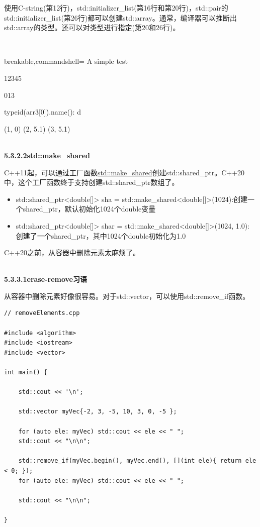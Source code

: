 使用C-string(第12行)，std::initializer\_list(第16行和第20行)，std::pair的std::initializer\_list(第26行)都可以创建std::array。通常，编译器可以推断出std::array的类型。还可以对类型进行指定(第20和26行)。

\hspace*{\fill} \\ %
\begin{tcblisting}{breakable,commandshell={}}
A simple test

12345

013

typeid(arr3[0]).name(): d

(1, 0)
(2, 5.1)
(3, 5.1)
\end{tcblisting}

\hspace*{\fill} \\ %
\noindent
\textbf{5.3.2.2\hspace{0.2cm}std::make\_shared}

C++11起，可以通过工厂函数\href{https://en.cppreference.com/w/cpp/memory/shared_ptr/make_shared}{std::make\_shared}创建std::shared\_ptr。C++20中，这个工厂函数终于支持创建std::shared\_ptr数组了。

\begin{itemize}
\item 
std::shared\_ptr<double[]> sha = std::make\_shared<double[]>(1024):创建一个shared\_ptr，默认初始化1024个double变量

\item 
std::shared\_ptr<double[]> shar = std::make\_shared<double[]>(1024, 1.0): 创建了一个shared\_ptr，其中1024个double初始化为1.0
\end{itemize}


C++20之前，从容器中删除元素太麻烦了。

\hspace*{\fill} \\ %
\noindent
\textbf{5.3.3.1\hspace{0.2cm}erase-remove习语}

从容器中删除元素好像很容易。对于std::vector，可以使用std::remove\_if函数。

\begin{lstlisting}[style=styleCXX]
// removeElements.cpp

#include <algorithm>
#include <iostream>
#include <vector>

int main() {

	std::cout << '\n';
	
	std::vector myVec{-2, 3, -5, 10, 3, 0, -5 };
	
	for (auto ele: myVec) std::cout << ele << " ";
	std::cout << "\n\n";
	
	std::remove_if(myVec.begin(), myVec.end(), [](int ele){ return ele < 0; });
	for (auto ele: myVec) std::cout << ele << " ";
	
	std::cout << "\n\n";

}
\end{lstlisting}


